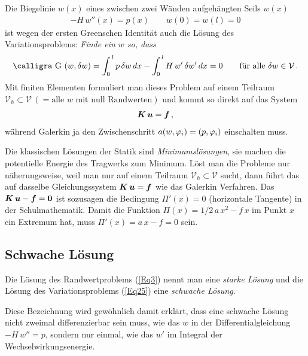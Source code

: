 Die Biegelinie $w(x)$ eines zwischen zwei W\"{a}nden aufgeh\"{a}ngten Seils $w(x)$
\begin{align}\label{Eq3}
- H\,w''(x) = p(x)  \qquad w(0) = w(l) = 0
\end{align}
ist wegen der ersten Greenschen Identit\"{a}t auch die L\"{o}sung des Variationsproblems: {\em Finde ein $w$ so, dass\/}
\begin{align}\label{Eq25}
\text{\normalfont\calligra G\,\,}(w,\delta w) = \int_0^{\,l} p\,\delta w\,dx - \int_0^{\,l} H\,w'\,\delta w'\,dx = 0 \qquad \text{f\"{u}r alle $\delta w \in \mathcal{V} $}\,.
\end{align}
Mit finiten Elementen formuliert man dieses Problem auf einem Teilraum $\mathcal{V}_h \subset \mathcal{V} \,(= \text{alle $w$ mit null Randwerten})$ und kommt so direkt auf das System
\begin{align}
\mbox{\boldmath $K$}\,\mbox{\boldmath $u$} = \mbox{\boldmath $f$}\,,
\end{align}
w\"{a}hrend Galerkin ja den Zwischenschritt $a(w,\varphi_i) = (p,\varphi_i)$ einschalten muss.

Die klassischen L\"{o}sungen der Statik sind {\em Minimumsl\"{o}sungen\/}, sie machen die potentielle Energie des Tragwerks zum Minimum. L\"{o}st man die Probleme nur n\"{a}herungsweise, weil man nur auf einem Teilraum $\mathcal{V}_h \subset \mathcal{V}$ sucht, dann f\"{u}hrt das auf dasselbe Gleichungssystem $\mbox{\boldmath $K$}\,\mbox{\boldmath $u$} = \mbox{\boldmath $f$}$ wie das Galerkin Verfahren. Das $\mbox{\boldmath $K$}\,\mbox{\boldmath $u$} - \mbox{\boldmath $f$} = \mbox{\boldmath $0$}$ ist sozusagen die Bedingung $\Pi'(x) = 0$ (horizontale Tangente) in der Schulmathematik. Damit die Funktion $\Pi(x) = 1/2\,a\,x^2 - f\,x$ im Punkt $x$ ein Extremum hat, muss $\Pi'(x) = a\,x - f = 0$ sein.

\textcolor{sectionTitleBlue}{\section{Schwache L\"{o}sung}}
Die L\"{o}sung des Randwertproblems (\ref{Eq3}) nennt man eine {\em starke L\"{o}sung\/} und die L\"{o}sung des Variationsproblems (\ref{Eq25}) eine {\em schwache L\"{o}sung\/}.

Diese Bezeichnung wird gew\"{o}hnlich damit erkl\"{a}rt, dass eine schwache L\"{o}sung nicht zweimal differenzierbar sein muss, wie das $w$ in der Differentialgleichung $-H\,w'' = p$, sondern nur einmal, wie das $w'$ im Integral der Wechselwirkungsenergie.

